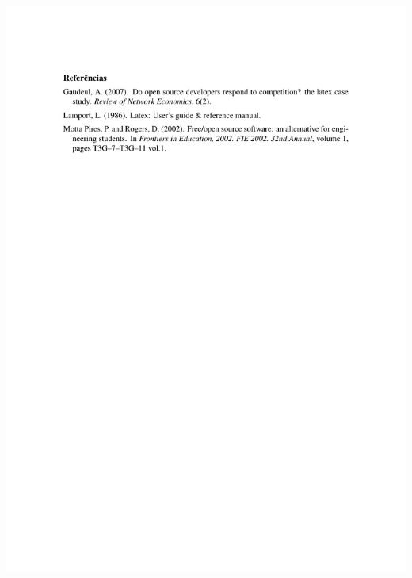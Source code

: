 {\noindent\includegraphics[trim=0 19cm 0 2cm,clip]{contents/intro_writing_conference/references/sbc-refs}

}
